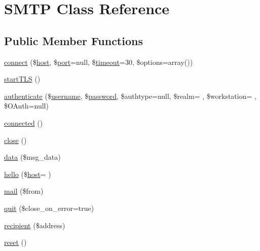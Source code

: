\hypertarget{class_s_m_t_p}{}\section{S\+M\+TP Class Reference}
\label{class_s_m_t_p}
\subsection*{Public Member Functions}
\begin{DoxyCompactItemize}
\item 
\hyperlink{class_s_m_t_p_a4635c65c419ade97f74c44e8dc323e9a}{connect} (\$\hyperlink{ossn_8config_8db_8example_8php_a5bc8babfba069f855b3288f34a926b5a}{host}, \$\hyperlink{ossn_8config_8db_8example_8php_a6e0ca192d866e7f150aa770832456ae2}{port}=null, \$\hyperlink{jquery_8tokeninput_8js_a819aaeaa17cffb37ebc9c81d46edf048}{timeout}=30, \$options=array())
\item 
\hyperlink{class_s_m_t_p_a58d9443a0a1690565edae142b85e0e26}{start\+T\+LS} ()
\item 
\hyperlink{class_s_m_t_p_a72b9410ebb8ca1607fb3517894314cf4}{authenticate} (\$\hyperlink{actions_2account_8php_ac9b3768ccc688c2ff0811c50c107a02e}{username}, \$\hyperlink{actions_2account_8php_a3ef39d3ee8b2bcca6a288308549ccb44}{password}, \$authtype=null, \$realm= \textquotesingle{}\textquotesingle{}, \$workstation= \textquotesingle{}\textquotesingle{}, \$O\+Auth=null)
\item 
\hyperlink{class_s_m_t_p_a166cb1f72761ff7c95d5d24055fe03f5}{connected} ()
\item 
\hyperlink{class_s_m_t_p_aa69c8bf1f1dcf4e72552efff1fe3e87e}{close} ()
\item 
\hyperlink{class_s_m_t_p_a3893229db738c613fc3f0914d73e989d}{data} (\$msg\+\_\+data)
\item 
\hyperlink{class_s_m_t_p_aa57f991acecc5b519b790fad49acbe78}{hello} (\$\hyperlink{ossn_8config_8db_8example_8php_a5bc8babfba069f855b3288f34a926b5a}{host}= \textquotesingle{}\textquotesingle{})
\item 
\hyperlink{class_s_m_t_p_af1cd1f904bc5404a8eb7fc4cf350fd67}{mail} (\$from)
\item 
\hyperlink{class_s_m_t_p_a2800929a8de0de9326f43190323d47bd}{quit} (\$close\+\_\+on\+\_\+error=true)
\item 
\hyperlink{class_s_m_t_p_a6eaa8fb8de9432240f84eb38229c147d}{recipient} (\$address)
\item 
\hyperlink{class_s_m_t_p_a4a20559544fdf4dcb457e258dc976cf8}{reset} ()

\end{DoxyCompactItemize}
